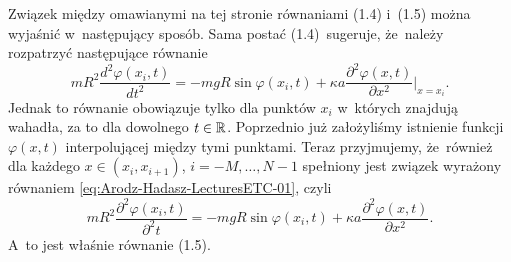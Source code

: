 \documentclass[a4paper,11pt]{article}
\begin{document}
\begin{center}
\end{center}

\vspace{\spaceTwo}











\newpage


\vspace{0em}



\vspace{0em}


\noindent
{} Związek między omawianymi na tej stronie równaniami
(1.4) i~(1.5) można wyjaśnić w~następujący sposób. Sama postać
(1.4)~sugeruje, że~należy rozpatrzyć następujące równanie
\begin{equation}
  \label{eq:Arodz-Hadasz-LecturesETC-01}
  m R^{ 2 } \frac{ d^{ 2 } \varphi( x_{ i }, t ) }{ dt^{ 2 } } =
  -m g R \sin \varphi( x_{ i }, t )
  + \kappa a \frac{ \partial^{ 2 } \varphi( x, t ) }{ \partial x^{ 2 } }\bigg|_{ x = x_{ i } }.
\end{equation}
Jednak to równanie obowiązuje tylko dla punktów $x_{ i }$ w~których
znajdują wahadła, za to dla dowolnego $t \in \mathbb{R}$. Poprzednio już
założyliśmy istnienie funkcji $\varphi( x , t )$ interpolującej między
tymi punktami. Teraz przyjmujemy, że~również dla każdego
$x \in ( x_{ i }, x_{ i + 1 } )$, $i = -M, \ldots, N - 1$ spełniony jest
związek wyrażony równaniem \eqref{eq:Arodz-Hadasz-LecturesETC-01}, czyli
\begin{equation}
  \label{eq:Arodz-Hadasz-LecturesETC-02}
  m R^{ 2 } \frac{ \partial^{ 2 } \varphi( x_{ i }, t ) }{ \partial^{ 2 } t } =
  -m g R \sin \varphi( x_{ i }, t )
  + \kappa a \frac{ \partial^{ 2 } \varphi( x, t ) }{ \partial x^{ 2 } }.
\end{equation}
A~to jest właśnie równanie (1.5).






\newpage

\end{document}
